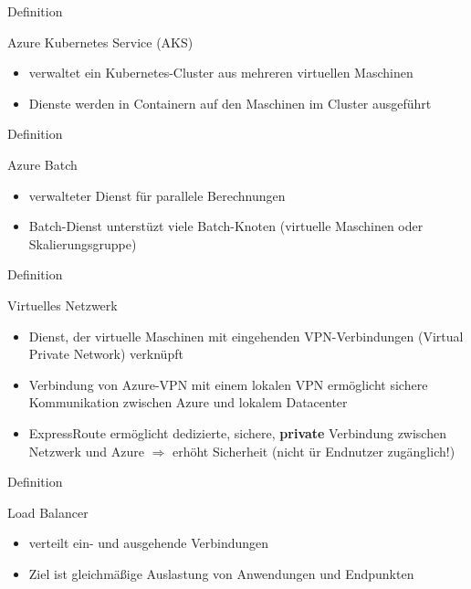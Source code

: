 \documentclass{scrartcl}
\newenvironment{flashcard}[2][]{%
    #1
    \vfill
    \centerline{\Large{#2}}
    \vfill
\newpage
}
{\newpage}
\begin{document}
    \begin{flashcard}[Definition]{Azure Kubernetes Service (AKS)}
        \begin{itemize}
            \item verwaltet ein Kubernetes-Cluster aus mehreren virtuellen Maschinen
            \item Dienste werden in Containern auf den Maschinen im Cluster ausgeführt
        \end{itemize}

    \end{flashcard}

    \begin{flashcard}[Definition]{Azure Batch}
        \begin{itemize}
            \item verwalteter Dienst für parallele Berechnungen
            \item Batch-Dienst unterstüzt viele Batch-Knoten (virtuelle Maschinen oder Skalierungsgruppe)
        \end{itemize}
    \end{flashcard}

    \begin{flashcard}[Definition]{Virtuelles Netzwerk}
        \begin{itemize}
            \item Dienst, der virtuelle Maschinen mit eingehenden VPN-Verbindungen (Virtual Private Network) verknüpft
            \item Verbindung von Azure-VPN mit einem lokalen VPN ermöglicht sichere Kommunikation zwischen Azure und lokalem Datacenter
            \item ExpressRoute ermöglicht dedizierte, sichere, \textbf{private} Verbindung zwischen Netzwerk und Azure\newline
            $\Rightarrow$ erhöht Sicherheit (nicht ür Endnutzer zugänglich!)
        \end{itemize}

    \end{flashcard}

    \begin{flashcard}[Definition]{Load Balancer}
        \begin{itemize}
            \item verteilt ein- und ausgehende Verbindungen
            \item Ziel ist gleichmäßige Auslastung von Anwendungen und Endpunkten
        \end{itemize}

    \end{flashcard}
\end{document}
